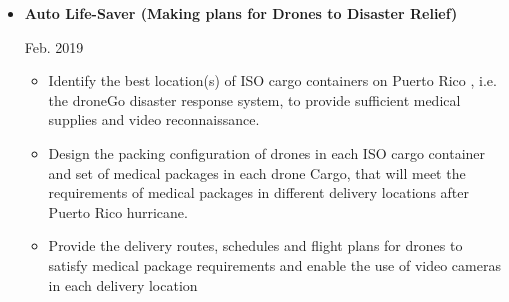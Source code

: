 \documentclass[]{article}
\newcommand{\rightAlign}{38em}
\begin{document}
\begin{itemize}
	
			\item 
	\begin{minipage}{\rightAlign}
		\begin{flushleft}                           
			\textbf{Auto Life-Saver (Making plans for Drones to Disaster Relief)} 
		\end{flushleft} 
	\end{minipage}
	\begin{minipage}{15em}
		Feb. 2019
	\end{minipage}
	\begin{itemize}[itemsep=0ex,leftmargin=1cm,rightmargin=.16\textwidth]
	\item Identify the best location(s) of ISO cargo containers on Puerto Rico , i.e. the droneGo disaster response system, to provide sufficient medical supplies and video reconnaissance.
	\item Design the packing configuration of drones in each ISO cargo container and set of medical packages in each drone Cargo, that will meet the requirements of medical packages in different delivery locations after Puerto Rico hurricane.
	\item Provide the delivery routes, schedules and flight plans for drones to satisfy medical package requirements and enable the use of video cameras in each delivery location
	\end{itemize}


\end{itemize}
\end{document}
